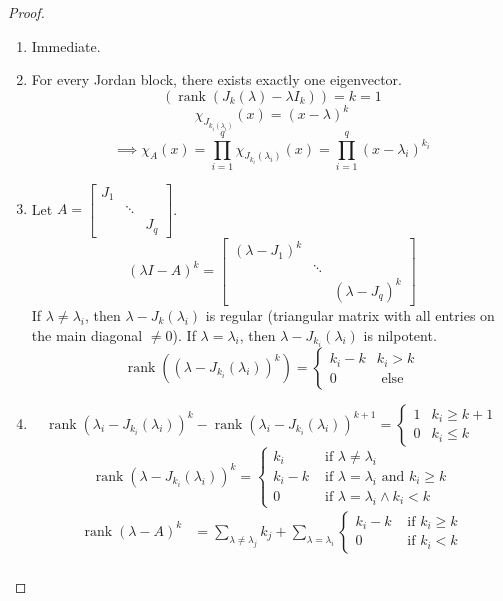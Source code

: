 \documentclass{article}
\DeclareMathOperator{\rank}{rank}
\begin{document}
\begin{proof}
  \begin{enumerate}
    \item Immediate.
    \item For every Jordan block, there exists exactly one eigenvector.
      \[ \left(\rank(J_k(\lambda) - \lambda I_k)\right) = k = 1 \]
      \[ \chi_{J_{k_i(\lambda_i)}}(x) = (x - \lambda)^k \]
      \[ \implies \chi_A(x) = \prod_{i=1}^q \chi_{J_{k_i}(\lambda_i)}(x) = \prod_{i=1}^q (x - \lambda_i)^{k_i} \]
    \item Let $A = \begin{bmatrix} J_1 & & \\ & \ddots & \\ & & J_q \end{bmatrix}$.
      \[ (\lambda I - A)^k = \begin{bmatrix} (\lambda - J_1)^k & & \\ & \ddots & \\ & & (\lambda - J_q)^k \end{bmatrix} \]
      If $\lambda \neq \lambda_i$, then $\lambda - J_k(\lambda_i)$ is regular (triangular matrix with all entries on the main diagonal $\neq 0$).
      If $\lambda = \lambda_i$, then $\lambda - J_{k_i}(\lambda_i)$ is nilpotent.
      \[
        \rank((\lambda - J_{k_i}(\lambda_i))^k) = \begin{cases}
          k_i - k & k_i > k \\
          0 & \text{ else}
        \end{cases}
      \]
    \item
      \[ \rank(\lambda_i - J_{k_i}(\lambda_i))^k - \rank(\lambda_i - J_{k_i}(\lambda_i))^{k+1} = \begin{cases} 1 & k_i \geq k+1 \\ 0 & k_i \leq k \end{cases} \]
      \[
        \rank(\lambda - J_{k_i}(\lambda_i))^k = \begin{cases}
          k_i & \text{ if } \lambda \neq \lambda_i \\
          k_i - k & \text{ if } \lambda = \lambda_i \text{ and } k_i \geq k \\
          0 & \text{ if } \lambda = \lambda_i \land k_i < k
        \end{cases}
      \]
      \begin{align*}
        \rank(\lambda - A)^k &= \sum_{\lambda \neq \lambda_j} k_j + \sum_{\lambda = \lambda_i} \begin{cases} k_i - k & \text{ if } k_i \geq k \\ 0 & \text{ if } k_i < k \end{cases} \\

\end{align*}
\end{enumerate}
\end{proof}
\end{document}
